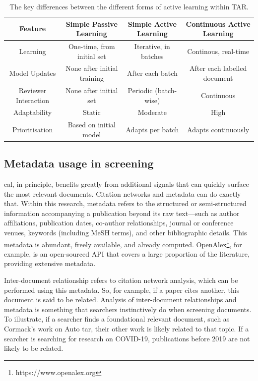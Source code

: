 \documentclass[10pt,oneside]{book}
\begin{document}
\begin{table}[t]

    \centering
    \footnotesize
    \begin{tabular}{|c|c|c|c|}
        \hline
        \textbf{Feature} & \textbf{Simple Passive Learning} & \textbf{Simple Active Learning} & \textbf{Continuous Active Learning} \\
        \hline
        Learning & One-time, from initial set  & Iterative, in batches  & Continous, real-time \\
        \hline
        Model Updates & None after initial training & After each batch & After each labelled document \\
        \hline
        Reviewer Interaction & None after initial set & Periodic (batch-wise) & Continuous \\
        \hline
        Adaptability & Static  & Moderate & High \\
        \hline
        Prioritisation & Based on initial model & Adapts per batch & Adapts continuously \\
        \hline
    \end{tabular}
    \caption{The key differences between the different forms of active learning within TAR.}
    \label{tab:differences_in_tar}
\end{table}



\subsection{Metadata usage in screening}

\gls*{cal}, in principle, benefits greatly from additional signals that can quickly surface the most relevant documents. Citation networks and metadata can do exactly that. Within this research, metadata refers to the structured or semi-structured information accompanying a publication beyond its raw text—such as author affiliations, publication dates, co-author relationships, journal or conference venues, keywords (including MeSH terms), and other bibliographic details. This metadata is abundant, freely available, and already computed. OpenAlex\footnote{https://www.openalex.org}, for example, is an open-sourced API that covers a large proportion of the literature, providing extensive metadata.

Inter-document relationship refers to citation network analysis, which can be performed using this metadata. So, for example, if a paper cites another, this document is said to be related. Analysis of inter-document relationships and metadata is something that searchers instinctively do when screening documents. To illustrate, if a searcher finds a foundational relevant document, such as Cormack's work on Auto \gls*{tar}, their other work is likely related to that topic. If a searcher is searching for research on COVID-19, publications before 2019 are not likely to be related. 
\end{document}

